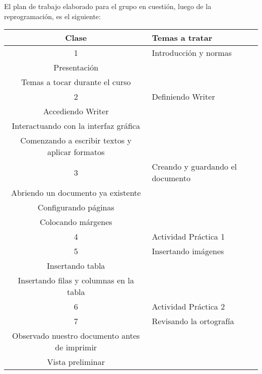             El plan de trabajo elaborado para el grupo en cuestión, luego de la reprogramación, es el siguiente:
			\begin{center}
                
		
            \begin{tabular}{|c|p{10cm}|}
						\hline
                        \textbf{Clase} & \textbf{Temas a tratar} 
                        \\ \hline
                        1 & \raggedright Introducción y normas
                        \\ Presentación
                        \\ Temas a tocar durante el curso
                        \tabularnewline \hline
                        2 & \raggedright Definiendo Writer\cite{writer}
                        \\ Accediendo Writer
                        \\ Interactuando con la interfaz gráfica
                        \\ Comenzando a escribir textos y aplicar formatos
                        \tabularnewline \hline
                        3 & \raggedright Creando y guardando el documento 
                        \\ Abriendo un documento ya existente
                        \\ Configurando páginas
                        \\ Colocando márgenes
                        \tabularnewline \hline
                        
                        4 & \raggedright Actividad Práctica 1
                        \tabularnewline \hline
                        
                        5 & \raggedright Insertando imágenes
                        \\ Insertando tabla
                        \\ Insertando filas y columnas en la tabla
                        \tabularnewline \hline

                        6 & \raggedright Actividad Práctica 2
                        \tabularnewline \hline   
                    
                        7 & \raggedright Revisando la ortografía
                        \\ Observado nuestro documento antes de imprimir
                        \\ Vista preliminar
                        \tabularnewline \hline
                         

\end{tabular}
\end{center}
